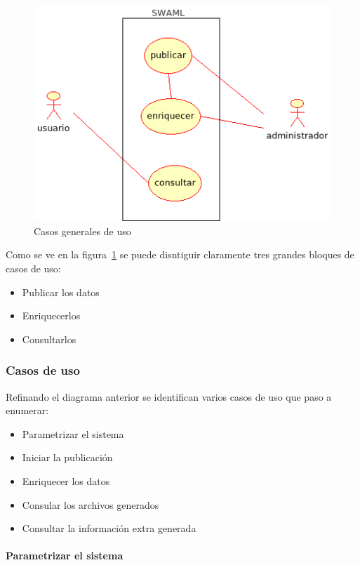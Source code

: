 \begin{figure}
 	\centering
	\includegraphics[width=12cm]{images/uml/casos-uso/general.png}
	\caption{Casos generales de uso}
	\label{uml:casos-uso}
\end{figure}

Como se ve en la figura~\ref{uml:casos-uso} se puede disntiguir claramente
tres grandes bloques de casos de uso:

\begin{itemize}
 \item Publicar los datos
 \item Enriquecerlos
 \item Consultarlos
\end{itemize}

\subsubsection{Casos de uso}

Refinando el diagrama anterior se identifican varios casos de uso que paso a
enumerar:

\begin{itemize}
 \item Parametrizar el sistema
 \item Iniciar la publicación
 \item Enriquecer los datos
 \item Consular los archivos generados
 \item Consultar la información extra generada
\end{itemize}


\paragraph{Parametrizar el sistema}

